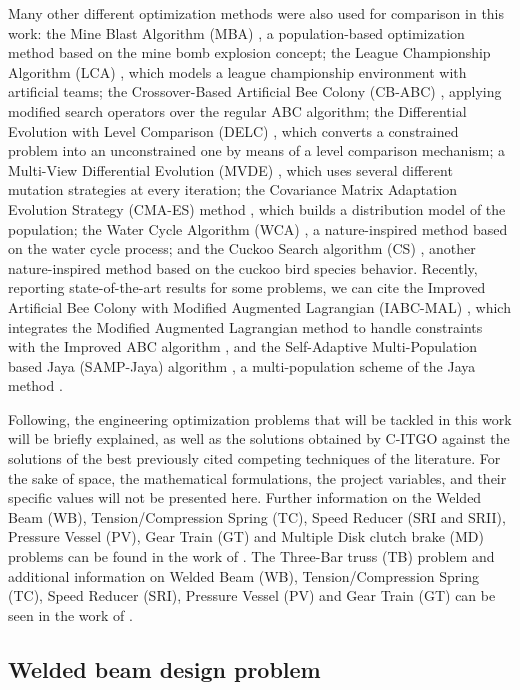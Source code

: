 Many other different optimization methods were also used for comparison in this work: the Mine Blast Algorithm (MBA) \citep{MBA}, a population-based optimization method based on the mine bomb explosion concept; the League Championship Algorithm (LCA) \citep{LCA}, which models a league championship environment with artificial teams; the Crossover-Based Artificial Bee Colony (CB-ABC) \citep{CB-ABC}, applying modified search operators over the regular ABC algorithm; the Differential Evolution with Level Comparison (DELC) \citep{DELC}, which converts a constrained problem into an unconstrained one by means of a level comparison mechanism; a Multi-View Differential Evolution (MVDE) \citep{MVDE}, which uses several different mutation strategies at every iteration; the Covariance Matrix Adaptation Evolution Strategy (CMA-ES) method \citep{CMA-ES}, which builds a distribution model of the population; the Water Cycle Algorithm (WCA) \citep{WCA}, a nature-inspired method based on the water cycle process; and the Cuckoo Search algorithm (CS) \citep{CS}, another nature-inspired method based on the cuckoo bird species behavior. Recently, reporting state-of-the-art results for some problems, we can cite the Improved Artificial Bee Colony with Modified Augmented Lagrangian (IABC-MAL) \citep{IABC-Mal}, which integrates the Modified Augmented Lagrangian method to handle constraints with the Improved ABC algorithm \citep{IABC}, and the Self-Adaptive Multi-Population based Jaya (SAMP-Jaya) algorithm \citep{SAMP-Jaya}, a multi-population scheme of the Jaya method \citep{Jaya}.


Following, the engineering optimization problems that will be tackled in this work will be briefly explained, as well as the solutions obtained by C-ITGO against the solutions of the best previously cited competing techniques of the literature. For the sake of space, the mathematical formulations, the project variables, and their specific values will not be presented here. Further information on the Welded Beam (WB), Tension/Compression Spring (TC), Speed Reducer (SRI and SRII), Pressure Vessel (PV), Gear Train (GT) and Multiple Disk clutch brake (MD) problems can be found in the work of \cite{IAPSO}. The Three-Bar truss (TB) problem and additional information on Welded Beam (WB), Tension/Compression Spring (TC), Speed Reducer (SRI), Pressure Vessel (PV) and Gear Train (GT) can be seen in the work of \cite{MBA}.



\subsection{Welded beam design problem}

